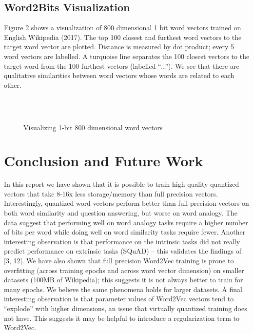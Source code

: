 \documentclass{article} %
\begin{document}
\subsection{Word2Bits Visualization}
Figure 2 shows a visualization of 800 dimensional 1 bit word vectors
trained on English Wikipedia (2017). The top 100 closest and furthest
word vectors to the target word vector are plotted. Distance is
measured by dot product; every 5 word vectors are labelled. A
turquoise line separates the 100 closest vectors to the target word
from the 100 furthest vectors (labelled ``...'').  We see that there
are qualitative similarities between word vectors whose words are
related to each other.

\begin{figure}%
    \centering
    \qquad
    \\
    \qquad
    \\
    \qquad
    \caption{Visualizing 1-bit 800 dimensional word vectors}
    \label{fig:viz}
\end{figure}

\section{Conclusion and Future Work}

In this report we have shown that it is possible to train high quality
quantized vectors that take 8-16x less storage/memory than full
precision vectors. Interestingly, quantized word vectors perform
better than full precision vectors on both word similarity and
question answering, but worse on word analogy. The data suggest that
performing well on word analogy tasks require a higher number of bits
per word while doing well on word similarity tasks require
fewer. Another interesting observation is that performance on the
intrinsic tasks did not really predict performance on extrinsic tasks
(SQuAD) -- this validates the findings of [3, 12]. We  have also shown
that full precision Word2Vec training is prone to overfitting (across
training epochs and across word vector dimension) on smaller datasets
(100MB of Wikipedia); this suggests it is not always better to train
for many epochs. We believe the same phenomena holds for larger
datasets. A final interesting observation is that parameter values of
Word2Vec vectors tend to ``explode'' with higher dimensions, an issue
that virtually quantized training does not have. This suggests it may
be helpful to introduce a regularization term to Word2Vec.
\end{document}
